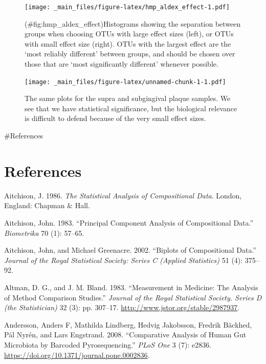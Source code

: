 \documentclass[onecolumn]{article}
\begin{document}
\begin{figure}
\centering
\texttt{[image: \_main\_files/figure-latex/hmp\_aldex\_effect-1.pdf]}
\caption{(\#fig:hmp\_aldex\_effect)Histograms showing the separation between groups when choosing OTUs with large effect sizes (left), or OTUs with small effect size (right). OTUs with the largest effect are the `most reliably different' between groups, and should be chosen over those that are `most significantly different' whenever possible.}
\end{figure}

\newpage

\begin{figure}
\centering
\texttt{[image: \_main\_files/figure-latex/unnamed-chunk-1-1.pdf]}
\caption{\label{fig:unnamed-chunk-1}The same plots for the supra and subgingival plaque samples. We see that we have statistical significance, but the biological relevance is difficult to defend because of the very small effect sizes.}
\end{figure}

\newpage

\#References

\hypertarget{references}{%
\section{References}\label{references}}

\hypertarget{refs}{}
\leavevmode\hypertarget{ref-Aitchison:1986}{}%
Aitchison, J. 1986. \emph{The Statistical Analysis of Compositional Data}. London, England: Chapman \& Hall.

\leavevmode\hypertarget{ref-Ait1983}{}%
Aitchison, John. 1983. ``Principal Component Analysis of Compositional Data.'' \emph{Biometrika} 70 (1): 57--65.

\leavevmode\hypertarget{ref-aitchison2002biplots}{}%
Aitchison, John, and Michael Greenacre. 2002. ``Biplots of Compositional Data.'' \emph{Journal of the Royal Statistical Society: Series C (Applied Statistics)} 51 (4): 375--92.

\leavevmode\hypertarget{ref-altman:1983}{}%
Altman, D. G., and J. M. Bland. 1983. ``Measurement in Medicine: The Analysis of Method Comparison Studies.'' \emph{Journal of the Royal Statistical Society. Series D (the Statistician)} 32 (3): pp. 307--17. \url{http://www.jstor.org/stable/2987937}.

\leavevmode\hypertarget{ref-Andersson:2008}{}%
Andersson, Anders F, Mathilda Lindberg, Hedvig Jakobsson, Fredrik Bäckhed, Pål Nyrén, and Lars Engstrand. 2008. ``Comparative Analysis of Human Gut Microbiota by Barcoded Pyrosequencing.'' \emph{PLoS One} 3 (7): e2836. \url{https://doi.org/10.1371/journal.pone.0002836}.
\end{document}
